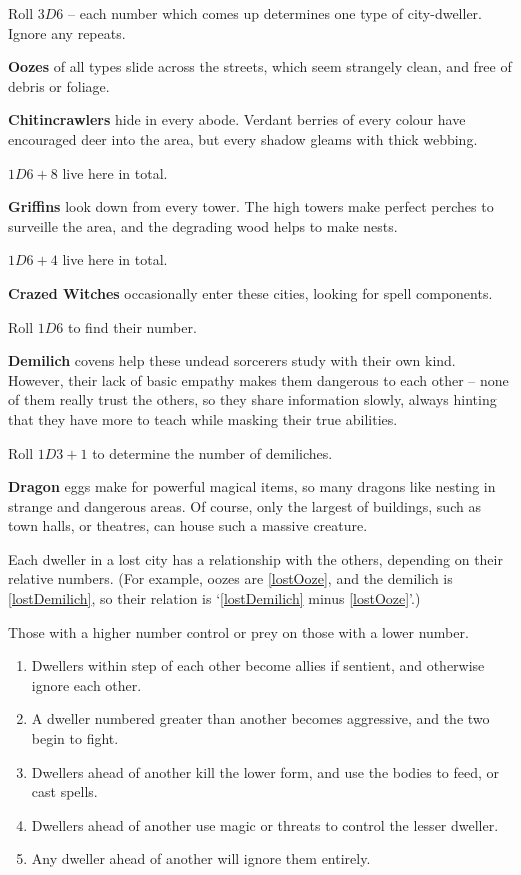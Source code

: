 \begin{multicols}{2}
Roll $3D6$ -- each number which comes up determines one type of city-dweller.
Ignore any repeats.

\begin{dlist}
  \item\label{lostOoze}
  \textbf{Oozes} of all types slide across the streets, which seem strangely clean, and free of debris or foliage.
  \item
  \textbf{Chitincrawlers} hide in every abode.
  Verdant berries of every colour have encouraged deer into the area, but every shadow gleams with thick webbing.

  $1D6+8$ live here in total.
  \item
  \textbf{Griffins} look down from every tower.
  The high towers make perfect perches to surveille the area, and the degrading wood helps to make nests.

  $1D6+4$ live here in total.
  \item
  \textbf{Crazed Witches} occasionally enter these cities, looking for spell components.

  Roll $1D6$ to find their number.
  \item\label{lostDemilich}
  \textbf{Demilich} covens help these undead sorcerers study with their own kind.
  However, their lack of basic empathy makes them dangerous to each other -- none of them really trust the others, so they share information slowly, always hinting that they have more to teach while masking their true abilities.

  Roll $1D3 + 1$ to determine the number of demiliches.
  \item
  \textbf{Dragon} eggs make for powerful magical items, so many dragons like nesting in strange and dangerous areas.
  Of course, only the largest of buildings, such as town halls, or theatres, can house such a massive creature.
\end{dlist}

Each dweller in a lost city has a relationship with the others, depending on their relative numbers.
(For example, oozes are \ref{lostOoze}, and the demilich is \ref{lostDemilich}, so their relation is `\ref{lostDemilich} minus \ref{lostOoze}'.)

Those with a higher number control or prey on those with a lower number.

\begin{enumerate}
  \item
  Dwellers within  step of each other become allies if sentient, and otherwise ignore each other.
  \item
  A dweller numbered  greater than another becomes aggressive, and the two begin to fight.
  \item
  Dwellers  ahead of another kill the lower form, and use the bodies to feed, or cast spells.
  \item
  Dwellers  ahead of another use magic or threats to control the lesser dweller.
  \item
  Any dweller  ahead of another will ignore them entirely.
\end{enumerate}


\end{multicols}
